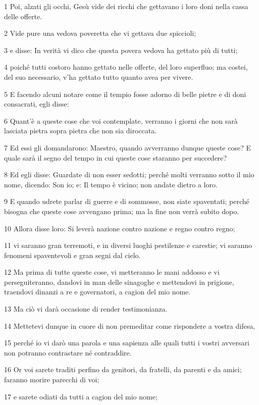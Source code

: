 \par 1 Poi, alzati gli occhi, Gesù vide dei ricchi che gettavano i loro doni nella cassa delle offerte.
\par 2 Vide pure una vedova poveretta che vi gettava due spiccioli;
\par 3 e disse: In verità vi dico che questa povera vedova ha gettato più di tutti;
\par 4 poiché tutti costoro hanno gettato nelle offerte, del loro superfluo; ma costei, del suo necessario, v'ha gettato tutto quanto avea per vivere.
\par 5 E facendo alcuni notare come il tempio fosse adorno di belle pietre e di doni consacrati, egli disse:
\par 6 Quant'è a queste cose che voi contemplate, verranno i giorni che non sarà lasciata pietra sopra pietra che non sia diroccata.
\par 7 Ed essi gli domandarono: Maestro, quando avverranno dunque queste cose? E quale sarà il segno del tempo in cui queste cose staranno per succedere?
\par 8 Ed egli disse: Guardate di non esser sedotti; perché molti verranno sotto il mio nome, dicendo: Son io; e: Il tempo è vicino; non andate dietro a loro.
\par 9 E quando udrete parlar di guerre e di sommosse, non siate spaventati; perché bisogna che queste cose avvengano prima; ma la fine non verrà subito dopo.
\par 10 Allora disse loro: Si leverà nazione contro nazione e regno contro regno;
\par 11 vi saranno gran terremoti, e in diversi luoghi pestilenze e carestie; vi saranno fenomeni spaventevoli e gran segni dal cielo.
\par 12 Ma prima di tutte queste cose, vi metteranno le mani addosso e vi perseguiteranno, dandovi in man delle sinagoghe e mettendovi in prigione, traendovi dinanzi a re e governatori, a cagion del mio nome.
\par 13 Ma ciò vi darà occasione di render testimonianza.
\par 14 Mettetevi dunque in cuore di non premeditar come rispondere a vostra difesa,
\par 15 perché io vi darò una parola e una sapienza alle quali tutti i vostri avversari non potranno contrastare né contraddire.
\par 16 Or voi sarete traditi perfino da genitori, da fratelli, da parenti e da amici; faranno morire parecchi di voi;
\par 17 e sarete odiati da tutti a cagion del mio nome;
